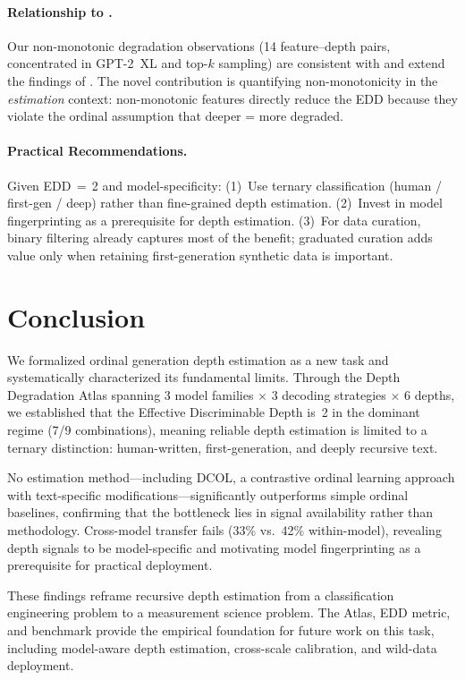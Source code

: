 \documentclass[11pt,a4paper]{article}
\begin{document}
\paragraph{Relationship to \citet{drayson2025model}.}
Our non-monotonic degradation observations (14 feature--depth pairs, concentrated in GPT-2~XL and top-$k$ sampling) are consistent with and extend the findings of \citet{drayson2025model}.
The novel contribution is quantifying non-monotonicity in the \emph{estimation} context: non-monotonic features directly reduce the EDD because they violate the ordinal assumption that deeper = more degraded.

\paragraph{Practical Recommendations.}
Given EDD\,$=$\,2 and model-specificity:
(1)~Use ternary classification (human / first-gen / deep) rather than fine-grained depth estimation.
(2)~Invest in model fingerprinting as a prerequisite for depth estimation.
(3)~For data curation, binary filtering already captures most of the benefit; graduated curation adds value only when retaining first-generation synthetic data is important.

\section{Conclusion}

We formalized ordinal generation depth estimation as a new task and systematically characterized its fundamental limits.
Through the Depth Degradation Atlas spanning 3 model families $\times$ 3 decoding strategies $\times$ 6 depths, we established that the Effective Discriminable Depth is~2 in the dominant regime (7/9 combinations), meaning reliable depth estimation is limited to a ternary distinction: human-written, first-generation, and deeply recursive text.

No estimation method---including DCOL, a contrastive ordinal learning approach with text-specific modifications---significantly outperforms simple ordinal baselines, confirming that the bottleneck lies in signal availability rather than methodology.
Cross-model transfer fails (33\% vs.\ 42\% within-model), revealing depth signals to be model-specific and motivating model fingerprinting as a prerequisite for practical deployment.

These findings reframe recursive depth estimation from a classification engineering problem to a measurement science problem.
The Atlas, EDD metric, and benchmark provide the empirical foundation for future work on this task, including model-aware depth estimation, cross-scale calibration, and wild-data deployment.
\end{document}

